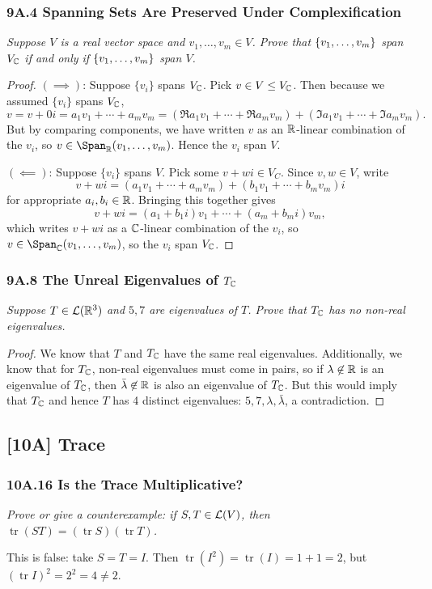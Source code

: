 \documentclass{article}
\DeclareMathOperator{\tr}{tr}
\begin{document}
\subsubsection*{9A.4 Spanning Sets Are Preserved Under Complexification}
\textit{Suppose $V$ is a real vector space and $v_1,\ldots, v_m\in V$. Prove that $\left\{v_1, \ldots, v_m\right\}$ span $V_\mathbb C$ if and only if $\left\{v_1, \ldots, v_m\right\}$ span $V$.}
\begin{proof}
$(\implies)$: Suppose $\{v_i\}$ spans $V_\mathbb C$. Pick $v \in V \leq V_\mathbb C$. Then because we assumed $\{v_i\}$ spans $V_\mathbb C$,
$$v = v+0i = a_1v_1  +\cdots + a_mv_m = (\Re a_1 v_1 + \cdots + \Re a_mv_m) + (\Im a_1v_1 + \cdots + \Im a_mv_m).$$
But by comparing components, we have written $v$ as an $\mathbb R$-linear combination of the $v_i$, so $v\in \Span_\R(v_1, \ldots, v_m)$. Hence the $v_i$ span $V$.


$(\impliedby)$: Suppose $\{v_i\}$ spans $V$. Pick some $v +wi \in V_C$. Since $v, w\in V$, write
$$v+wi = (a_1v_1 + \cdots + a_mv_m) + (b_1v_1 + \cdots + b_mv_m)i$$
for appropriate $a_i, b_i\in \mathbb R$. Bringing this together gives
$$v+wi = (a_1+b_1i)v_1 + \cdots + (a_m+b_mi)v_m,$$
which writes $v+wi$ as a $\mathbb C$-linear combination of the $v_i$, so $v\in\Span_\C(v_1,\ldots, v_m)$, so the $v_i$ span $V_\mathbb C$.
\end{proof}
\subsubsection*{9A.8 The Unreal Eigenvalues of $T_\mathbb C$}
\textit{Suppose $T\in\mathcal L(\mathbb R^3)$ and $5, 7$ are eigenvalues of $T$. Prove that $T_\mathbb C$ has no non-real eigenvalues.}
\begin{proof}
We know that $T$ and $T_\mathbb C$ have the same real eigenvalues. Additionally, we know that for $T_\mathbb C$, non-real eigenvalues must come in pairs, so if $\lambda\not\in \mathbb R$ is an eigenvalue of $T_\mathbb C$, then $\bar\lambda\not\in \mathbb R$ is also an eigenvalue of $T_\mathbb C$. But this would imply that $T_\mathbb C$ and hence $T$ has 4 distinct eigenvalues: $5, 7, \lambda, \bar\lambda$, a contradiction.
\end{proof}
\subsection*{[10A] Trace}
\subsubsection*{10A.16 Is the Trace Multiplicative?}
\textit{Prove or give a counterexample: if $S,T\in\mathcal L(V)$, then $\tr(ST) = (\tr S)(\tr T)$.}
\begin{solution}
This is false: take $S = T = I$. Then $\tr(I^2) = \tr(I) = 1+1=2$, but $(\tr I)^2 = 2^2 = 4\neq 2$.
\end{solution}
\end{document}
